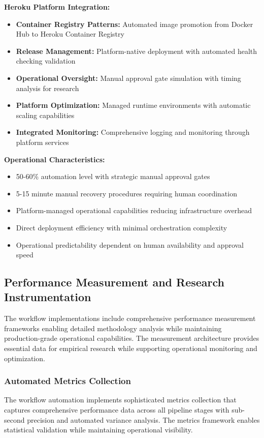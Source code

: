 \textbf{Heroku Platform Integration:}
\begin{itemize}
\item \textbf{Container Registry Patterns:} Automated image promotion from Docker Hub to Heroku Container Registry
\item \textbf{Release Management:} Platform-native deployment with automated health checking validation
\item \textbf{Operational Oversight:} Manual approval gate simulation with timing analysis for research
\item \textbf{Platform Optimization:} Managed runtime environments with automatic scaling capabilities
\item \textbf{Integrated Monitoring:} Comprehensive logging and monitoring through platform services
\end{itemize}

\textbf{Operational Characteristics:}
\begin{itemize}
\item 50-60\% automation level with strategic manual approval gates
\item 5-15 minute manual recovery procedures requiring human coordination
\item Platform-managed operational capabilities reducing infrastructure overhead
\item Direct deployment efficiency with minimal orchestration complexity
\item Operational predictability dependent on human availability and approval speed
\end{itemize}

\subsection{Performance Measurement and Research Instrumentation}

The workflow implementations include comprehensive performance measurement frameworks enabling detailed methodology analysis while maintaining production-grade operational capabilities. The measurement architecture provides essential data for empirical research while supporting operational monitoring and optimization.

\subsubsection{Automated Metrics Collection}

The workflow automation implements sophisticated metrics collection that captures comprehensive performance data across all pipeline stages with sub-second precision and automated variance analysis. The metrics framework enables statistical validation while maintaining operational visibility.

